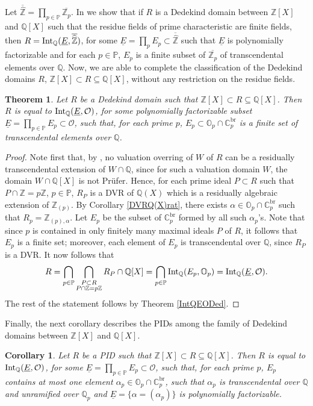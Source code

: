 \documentclass[10pt]{article}
\numberwithin{equation}{section}
\newtheorem{Thm}[equation]{Theorem}
\newtheorem{Cor}[equation]{Corollary}
\theoremstyle{definition}\newtheorem{Def}[equation]{Definition}
\theoremstyle{definition}\newtheorem{Ques}[equation]{Question}
\newcommand{\Q}{\mathbb{Q}}
\newcommand{\Z}{\mathbb{Z}}
\renewcommand{\O}{\mathbb{O}}
\newcommand{\C}{\mathbb{C}}
\newcommand{\PP}{\mathbb{P}}
\newcommand{\Int}{\textnormal{Int}}
\newcommand{\IntQ}{\Int_{\Q}}
\newcommand{\uE}{\underline{E}}
\newcommand{\oZp}{\overline{\Z_p}}
\newcommand{\hZ}{\widehat{\mathbb{Z}}}
\newcommand{\ohZ}{\overline{\hZ}}
\begin{document}
Let $\ohZ=\prod_{p\in\PP}\oZp$. In \cite[Theorem 2.17]{PerDedekind} we show that if $R$ is a Dedekind domain between $\Z[X]$ and $\Q[X]$ such that the residue fields of prime characteristic are finite fields, then $R=\IntQ(\uE,\ohZ)$, for some $\uE=\prod_p E_p\subset\ohZ$ such that $\uE$ is polynomially factorizable and for each $p\in\PP$, $E_p$ is a finite subset of $\oZp$  of transcendental elements over $\Q$.
Now, we are able to complete the classification of the Dedekind domains $R$, $\Z[X]\subset R\subseteq\Q[X]$, without any restriction on the residue fields.
\begin{Thm}\label{PolDedekind}
Let $R$ be a Dedekind domain such that $\Z[X]\subset R\subseteq \Q[X]$. Then $R$ is equal to $\Int_{\Q}(\uE,\mathcal{O})$, for some polynomially factorizable subset $\uE=\prod_{p\in\PP}E_p\subset\mathcal{O}$, such that, for each prime $p$,  $E_p\subset \O_p\cap\C_p^{\text{br}}$ is a finite set of transcendental elements over $\Q$.
\end{Thm}
\begin{proof}
Note first that, by \cite[Theorem 3.14]{PerPrufer}, no valuation overring of $W$ of $R$ can be a residually transcendental extension of $W\cap\Q$, since for such a valuation domain $W$, the domain $W\cap\Q[X]$ is not Pr\"ufer. Hence, for each prime ideal $P\subset R$ such that $P\cap\Z=p\Z$, $p\in\PP$, $R_P$ is a DVR of $\Q(X)$ which is a residually algebraic extension of $\Z_{(p)}$. By Corollary \ref{DVRQ(X)rat}, there exists $\alpha\in \O_p\cap\C_p^{\text{br}}$ such that $R_p=\Z_{(p),\alpha}$. Let $E_p$ be the subset of $\C_p^{\text{br}}$ formed by all such $\alpha_p$'s. Note that since $p$ is contained in only finitely many maximal ideals $P$ of $R$, it follows that $E_p$ is a finite set; moreover, each element of $E_p$ is transcendental over $\Q$, since $R_P$ is a DVR.  It now follows that 
$$R=\bigcap_{p\in\PP}\bigcap_{\substack{P\subset R\\P\cap\Z=p\Z}}R_P\cap\Q[X]=\bigcap_{p\in\PP}\IntQ(E_p,\O_p)=\IntQ(\uE,\mathcal{O}).$$
The rest of the statement follows by Theorem \ref{IntQEODed}.
\end{proof}
Finally, the next corollary describes the PIDs among the family of Dedekind domains between $\Z[X]$ and $\Q[X]$.
\begin{Cor}
Let $R$ be a PID such that $\Z[X]\subset R\subseteq \Q[X]$. Then $R$ is equal to $\Int_{\Q}(\uE,\mathcal{O})$, for some $\uE=\prod_{p\in\PP}E_p\subset\mathcal{O}$, such that, for each prime $p$,  $E_p$ contains at most one element $\alpha_p\in \O_p\cap\C_p^{\text{br}}$, such that $\alpha_p$ is transcendental over $\Q$ and unramified over $\Q_p$ and $\uE=\{\alpha=(\alpha_p)\}$ is polynomially factorizable.
\end{Cor}
\end{document}
